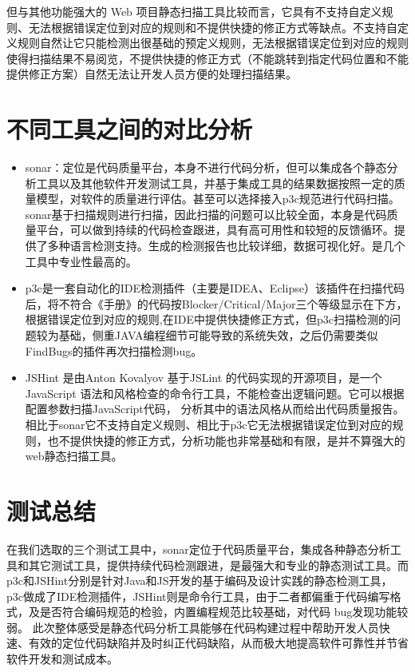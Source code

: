 \documentclass[hyperref, a4paper]{ctexart}
\begin{document}
但与其他功能强大的 Web
项目静态扫描工具比较而言，它具有不支持自定义规则、无法根据错误定位到对应的规则和不提供快捷的修正方式等缺点。不支持自定义规则自然让它只能检测出很基础的预定义规则，无法根据错误定位到对应的规则使得扫描结果不易阅览，不提供快捷的修正方式（不能跳转到指定代码位置和不能提供修正方案）自然无法让开发人员方便的处理扫描结果。

\hypertarget{ux4e0dux540cux5de5ux5177ux4e4bux95f4ux7684ux5bf9ux6bd4ux5206ux6790}{%
\section{不同工具之间的对比分析}\label{ux4e0dux540cux5de5ux5177ux4e4bux95f4ux7684ux5bf9ux6bd4ux5206ux6790}}

\begin{itemize}
\item
  sonar：定位是代码质量平台，本身不进行代码分析，但可以集成各个静态分析工具以及其他软件开发测试工具，并基于集成工具的结果数据按照一定的质量模型，对软件的质量进行评估。甚至可以选择接入p3c规范进行代码扫描。sonar基于扫描规则进行扫描，因此扫描的问题可以比较全面，本身是代码质量平台，可以做到持续的代码检查跟进，具有高可用性和较短的反馈循环。提供了多种语言检测支持。生成的检测报告也比较详细，数据可视化好。是几个工具中专业性最高的。
\item
  p3c是一套自动化的IDE检测插件（主要是IDEA、Eclipse）该插件在扫描代码后，将不符合《手册》的代码按Blocker/Critical/Major三个等级显示在下方，根据错误定位到对应的规则,在IDE中提供快捷修正方式，但p3c扫描检测的问题较为基础，侧重JAVA编程细节可能导致的系统失效，之后仍需要类似FindBugs的插件再次扫描检测bug。
\item
  JSHint 是由Anton Kovalyov 基于JSLint
  的代码实现的开源项目，是一个JavaScript
  语法和风格检查的命令行工具，不能检查出逻辑问题。它可以根据配置参数扫描JavaScript代码，
  分析其中的语法风格从而给出代码质量报告。相比于sonar它不支持自定义规则、相比于p3c它无法根据错误定位到对应的规则，也不提供快捷的修正方式，分析功能也非常基础和有限，是并不算强大的web静态扫描工具。
\end{itemize}

\hypertarget{ux6d4bux8bd5ux603bux7ed3}{%
\section{测试总结}\label{ux6d4bux8bd5ux603bux7ed3}}

在我们选取的三个测试工具中，sonar定位于代码质量平台，集成各种静态分析工具和其它测试工具，提供持续代码检测跟进，是最强大和专业的静态测试工具。而p3c和JSHint分别是针对Java和JS开发的基于编码及设计实践的静态检测工具，p3c做成了IDE检测插件，JSHint则是命令行工具，由于二者都偏重于代码编写格式，及是否符合编码规范的检验，内置编程规范比较基础，对代码
bug发现功能较弱。
此次整体感受是静态代码分析工具能够在代码构建过程中帮助开发人员快速、有效的定位代码缺陷并及时纠正代码缺陷，从而极大地提高软件可靠性并节省软件开发和测试成本。
\end{document}
